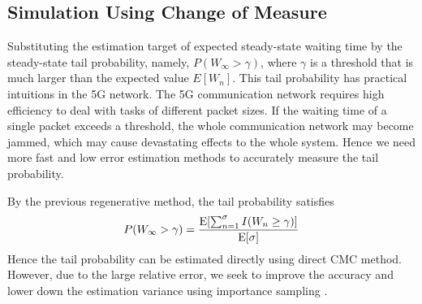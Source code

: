 \documentclass{article}
\begin{document}

\subsection{Simulation Using Change of Measure}
Substituting the estimation target of expected steady-state waiting time by the steady-state tail probability, namely, $P(W_{\infty} > \gamma)$, where $\gamma$ is a threshold that is much larger than the expected value $E[W_n]$. This tail probability has practical intuitions in the 5G network. The 5G communication network requires high efficiency to deal with tasks of different packet sizes. If the waiting time of a single packet exceeds a threshold, the whole communication network may become jammed, which may cause devastating effects to the whole system. 
Hence we need more fast and low error estimation methods to accurately measure the tail probability.

By the previous regenerative method, the tail probability satisfies
\begin{equation}
	P(W_{\infty}>\gamma)=\frac{{\rm E}[\sum_{n=1}^{\sigma}I(W_n \geq \gamma)]}{{\rm E}[\sigma]}	
\end{equation}
Hence the tail probability can be estimated directly using direct CMC method. However, due to the large relative error, we seek to improve the accuracy and lower down the estimation variance using importance sampling \citep{ross2014introduction}.
\end{document}
